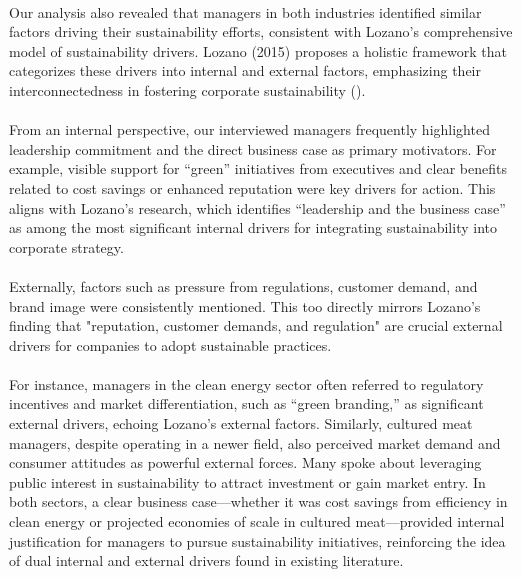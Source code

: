 	\paragraph*{} Our analysis also revealed that managers in both industries identified similar factors driving their sustainability efforts, consistent with Lozano’s comprehensive model of sustainability drivers. Lozano (2015) proposes a holistic framework that categorizes these drivers into internal and external factors, emphasizing their interconnectedness in fostering corporate sustainability (\textcite{Lozano2015}).
	
	\paragraph*{} From an internal perspective, our interviewed managers frequently highlighted leadership commitment and the direct business case as primary motivators. For example, visible support for ``green'' initiatives from executives and clear benefits related to cost savings or enhanced reputation were key drivers for action. This aligns with Lozano’s research, which identifies ``leadership and the business case'' as among the most significant internal drivers for integrating sustainability into corporate strategy.
	
	\paragraph*{} Externally, factors such as pressure from regulations, customer demand, and brand image were consistently mentioned. This too directly mirrors Lozano’s finding that "reputation, customer demands, and regulation" are crucial external drivers for companies to adopt sustainable practices.
	
	\paragraph*{} For instance, managers in the clean energy sector often referred to regulatory incentives and market differentiation, such as ``green branding,'' as significant external drivers, echoing Lozano’s external factors. Similarly, cultured meat managers, despite operating in a newer field, also perceived market demand and consumer attitudes as powerful external forces. Many spoke about leveraging public interest in sustainability to attract investment or gain market entry. In both sectors, a clear business case—whether it was cost savings from efficiency in clean energy or projected economies of scale in cultured meat—provided internal justification for managers to pursue sustainability initiatives, reinforcing the idea of dual internal and external drivers found in existing literature.
	
